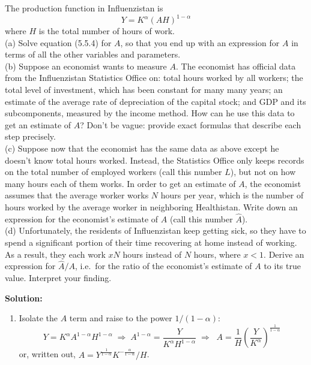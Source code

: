 \documentclass[12pt, letterpaper]{article}
\begin{document}
\begin{tcolorbox}[oddbox,title={Problem 5.9 \quad Disease and TFP}]
\begin{tcolorbox}[questionbox]
The production function in Influenzistan is
\[
Y=K^{\alpha}(AH)^{1-\alpha}
\tag{5.5.4}
\]
where $H$ is the total number of hours of work.\\[3pt]
(a) Solve equation (5.5.4) for $A$, so that you end up with an expression for $A$ in terms
of all the other variables and parameters.\\[3pt]
(b) Suppose an economist wants to measure $A$. The economist has official data from the
Influenzistan Statistics Office on: total hours worked by all workers; the total level of
investment, which has been constant for many many years; an estimate of the average rate of
depreciation of the capital stock; and GDP and its subcomponents, measured by the income
method. How can he use this data to get an estimate of $A$? Don't be vague: provide exact
formulas that describe each step precisely.\\[3pt]
(c) Suppose now that the economist has the same data as above except he doesn't know total
hours worked. Instead, the Statistics Office only keeps records on the total number of
employed workers (call this number $L$), but not on how many hours each of them works. In
order to get an estimate of $A$, the economist assumes that the average worker works $N$
hours per year, which is the number of hours worked by the average worker in neighboring
Healthistan. Write down an expression for the economist's estimate of $A$ (call this number
$\hat A$).\\[3pt]
(d) Unfortunately, the residents of Influenzistan keep getting sick, so they have to spend a
significant portion of their time recovering at home instead of working. As a result, they
each work $xN$ hours instead of $N$ hours, where $x<1$. Derive an expression for $\hat A/A$,
i.e.\ for the ratio of the economist's estimate of $A$ to its true value. Interpret your
finding.
\end{tcolorbox}

\textbf{Solution:}
\begin{enumerate}

\item Isolate the $A$ term and raise to the power $1/(1-\alpha)$:
\[
Y=K^{\alpha}A^{1-\alpha}H^{1-\alpha}
\;\Longrightarrow\;
A^{1-\alpha}=\frac{Y}{K^{\alpha}H^{1-\alpha}}
\;\Longrightarrow\;
\boxed{\;A=\frac{1}{H}\left(\frac{Y}{K^{\alpha}}\right)^{\frac{1}{1-\alpha}}\;}
\tag{5.9.a}
\]
or, written out, $A=Y^{\frac{1}{1-\alpha}}K^{-\frac{\alpha}{1-\alpha}}/H$.


\end{enumerate}
\end{tcolorbox}
\end{document}
